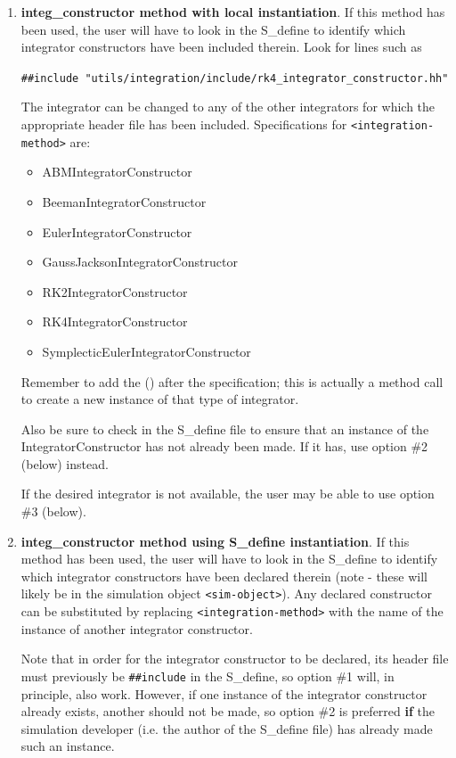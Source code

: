 \begin{enumerate}
 \item \textbf{integ\_constructor method with local instantiation}.
 If this method has been used, the 
 user will have to look in the S\_define to identify which integrator 
 constructors have been included therein.  Look for lines such as 

 \verb+##include "utils/integration/include/rk4_integrator_constructor.hh"+

 The integrator can be changed to any of the other integrators for which the 
 appropriate header file has been included.  Specifications for 
 \verb+<integration-method>+ are:
 \begin{itemize}
  \item ABMIntegratorConstructor
  \item BeemanIntegratorConstructor
  \item EulerIntegratorConstructor
  \item GaussJacksonIntegratorConstructor
  \item RK2IntegratorConstructor
  \item RK4IntegratorConstructor
  \item SymplecticEulerIntegratorConstructor
 \end{itemize}

 Remember to add the () after the specification; this is actually a method 
 call to create a new instance of that type of integrator.

 Also be sure to check in the S\_define file to ensure that an instance of the 
 IntegratorConstructor has not already been made.  If it has, use option \#2 
 (below) instead.

 If the desired integrator is not available, the user may be able to use 
 option \#3 (below).


 \item \textbf{integ\_constructor method using S\_define instantiation}.
 If this method has been used, 
 the user will have to look in the S\_define to identify which integrator 
 constructors have been declared therein (note - these will likely be in the 
 simulation object \verb+<sim-object>+).  Any declared constructor can be 
 substituted by replacing \verb+<integration-method>+ with the name of 
 the instance of another integrator constructor.  

 Note that in order for the integrator constructor to be declared, its header 
 file must previously be \verb+##include+ in the S\_define, so option \#1 
 will, in principle, also work.  
 However, if one instance of the integrator 
 constructor already exists, another should not be made, so option \#2 is 
 preferred \textbf{if} the simulation developer (i.e. the author of the 
 S\_define file) has already made such an 
 instance.


\end{enumerate}
